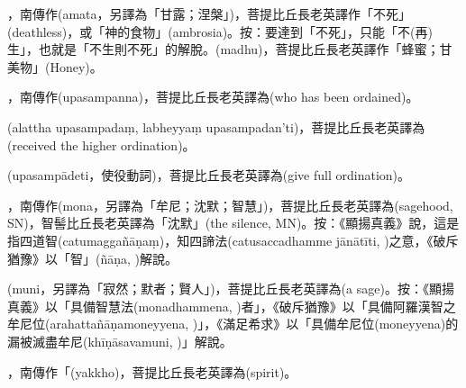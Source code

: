 \startitemgroup[noteitems]
\item{}，南傳作(amata，另譯為「甘露；涅槃」)，菩提比丘長老英譯作「不死」(deathless)，或「神的食物」(ambrosia)。按：要達到「不死」，只能「不(再)生」，也就是「不生則不死」的解脫。(madhu)，菩提比丘長老英譯作「蜂蜜；甘美物」(Honey)。
\stopitemgroup

\startitemgroup[noteitems]
\item{}，南傳作(upasampanna)，菩提比丘長老英譯為(who has been ordained)。
\item{}(alattha upasampadaṃ, labheyyaṃ upasampadan’ti)，菩提比丘長老英譯為(received the higher ordination)。
\item{}(upasampādeti，使役動詞)，菩提比丘長老英譯為(give full ordination)。
\stopitemgroup

\startitemgroup[noteitems]
\item{}，南傳作(mona，另譯為「牟尼；沈默；智慧」)，菩提比丘長老英譯為(sagehood, SN)，智髻比丘長老英譯為「沈默」(the silence, MN)。按：《顯揚真義》說，這是指四道智(catumaggañāṇaṃ)，知四諦法(catusaccadhamme jānātīti, )之意，《破斥猶豫》以「智」(ñāṇa, )解說。
\item{}(muni，另譯為「寂然；默者；賢人」)，菩提比丘長老英譯為(a sage)。按：《顯揚真義》以「具備智慧法(monadhammena, )者」，《破斥猶豫》以「具備阿羅漢智之牟尼位(arahattañāṇamoneyyena, )」，《滿足希求》以「具備牟尼位(moneyyena)的漏被滅盡牟尼(khīṇāsavamuni, )」解說。
\stopitemgroup

\startitemgroup[noteitems]
\item{}，南傳作「(yakkho)，菩提比丘長老英譯為(spirit)。
\stopitemgroup

